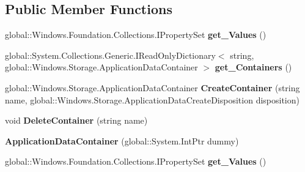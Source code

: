 \subsection*{Public Member Functions}
\begin{DoxyCompactItemize}
\item 
\mbox{\label{class_windows_1_1_storage_1_1_application_data_container_a3c0afb245420d44945e67800bf1aae9f}} 
global\+::\+Windows.\+Foundation.\+Collections.\+I\+Property\+Set {\bfseries get\+\_\+\+Values} ()
\item 
\mbox{\label{class_windows_1_1_storage_1_1_application_data_container_a361c8478595cda5b8019768201c65b27}} 
global\+::\+System.\+Collections.\+Generic.\+I\+Read\+Only\+Dictionary$<$ string, global\+::\+Windows.\+Storage.\+Application\+Data\+Container $>$ {\bfseries get\+\_\+\+Containers} ()
\item 
\mbox{\label{class_windows_1_1_storage_1_1_application_data_container_ad7aefe4a6e2c696f8ac1044c1649ab0a}} 
global\+::\+Windows.\+Storage.\+Application\+Data\+Container {\bfseries Create\+Container} (string name, global\+::\+Windows.\+Storage.\+Application\+Data\+Create\+Disposition disposition)
\item 
\mbox{\label{class_windows_1_1_storage_1_1_application_data_container_ae10280581ba75a8732781e66d0037ef0}} 
void {\bfseries Delete\+Container} (string name)
\item 
\mbox{\label{class_windows_1_1_storage_1_1_application_data_container_a0649013a245656d416ecc5a7f192010b}} 
{\bfseries Application\+Data\+Container} (global\+::\+System.\+Int\+Ptr dummy)
\item 
\mbox{\label{class_windows_1_1_storage_1_1_application_data_container_a3c0afb245420d44945e67800bf1aae9f}} 
global\+::\+Windows.\+Foundation.\+Collections.\+I\+Property\+Set {\bfseries get\+\_\+\+Values} ()
\item 
\mbox{\label{class_windows_1_1_storage_1_1_application_data_container_a361c8478595cda5b8019768201c65b27}} 

\end{DoxyCompactItemize}
